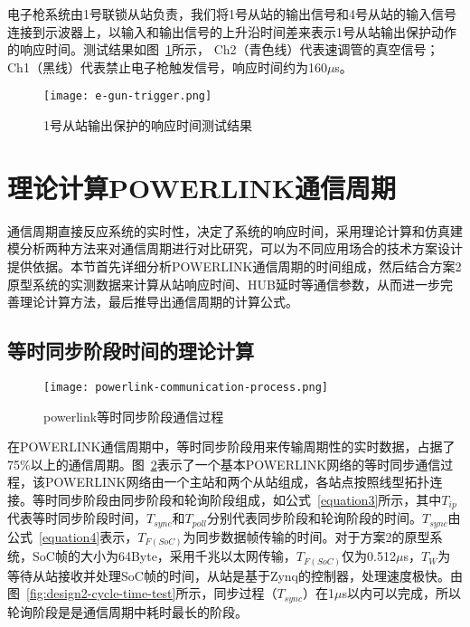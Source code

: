 电子枪系统由1号联锁从站负责，我们将1号从站的输出信号和4号从站的输入信号连接到示波器上，以输入和输出信号的上升沿时间差来表示1号从站输出保护动作的响应时间。测试结果如图~\ref{fig:e-gun-trigger}所示， Ch2（青色线）代表速调管的真空信号； Ch1（黑线）代表禁止电子枪触发信号，响应时间约为160$\mu$s。

\begin{figure}[!htb]
	\centering
	\texttt{[image: e-gun-trigger.png]}
	\caption{1号从站输出保护的响应时间测试结果}
	\label{fig:e-gun-trigger}
\end{figure}

\section{理论计算POWERLINK通信周期}

\label{section:理论计算POWERLINK通信周期}
通信周期直接反应系统的实时性，决定了系统的响应时间，采用理论计算和仿真建模分析两种方法来对通信周期进行对比研究，可以为不同应用场合的技术方案设计提供依据。本节首先详细分析POWERLINK通信周期的时间组成，然后结合方案2原型系统的实测数据来计算从站响应时间、HUB延时等通信参数，从而进一步完善理论计算方法，最后推导出通信周期的计算公式。

\subsection{等时同步阶段时间的理论计算}

\label{subsection:等时同步阶段时间的理论计算}

\begin{figure}[!htb]
  \centering
  \texttt{[image: powerlink-communication-process.png]}
  \caption{powerlink等时同步阶段通信过程}
  \label{fig:powerlink-communication-process}
\end{figure}

在POWERLINK通信周期中，等时同步阶段用来传输周期性的实时数据，占据了75\%以上的通信周期。图~\ref{fig:powerlink-communication-process}表示了一个基本POWERLINK网络的等时同步通信过程，该POWERLINK网络由一个主站和两个从站组成，各站点按照线型拓扑连接。等时同步阶段由同步阶段和轮询阶段组成，如公式~\ref{equation3}所示，其中$T_{ip}$代表等时同步阶段时间，$T_{sync}$和$T_{poll}$分别代表同步阶段和轮询阶段的时间。$T_{sync}$由公式~\ref{equation4}表示，$T_{F(SoC)}$为同步数据帧传输的时间。对于方案2的原型系统，SoC帧的大小为64Byte，采用千兆以太网传输，$T_{F(SoC)}$仅为0.512$\mu$s，$T_{W}$为等待从站接收并处理SoC帧的时间，从站是基于Zynq的控制器，处理速度极快。由图~\ref{fig:design2-cycle-time-test}所示，同步过程（$T_{sync}$）在1$\mu$s以内可以完成，所以轮询阶段是是通信周期中耗时最长的阶段。


